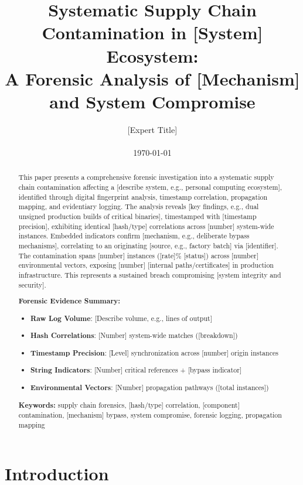 \documentclass[12pt,a4paper]{article}
\title{\Huge Systematic Supply Chain Contamination in [System] Ecosystem: \\
\Large A Forensic Analysis of [Mechanism] and System Compromise}
\author{[Expert Title] \\ 
[Location] \\
\today}
\date{}
\begin{document}
\maketitle

\begin{abstract}
This paper presents a comprehensive forensic investigation into a systematic supply chain contamination affecting a [describe system, e.g., personal computing ecosystem], identified through digital fingerprint analysis, timestamp correlation, propagation mapping, and evidentiary logging. The analysis reveals [key findings, e.g., dual unsigned production builds of critical binaries], timestamped with [timestamp precision], exhibiting identical [hash/type] correlations across [number] system-wide instances. Embedded indicators confirm [mechanism, e.g., deliberate bypass mechanisms], correlating to an originating [source, e.g., factory batch] via [identifier]. The contamination spans [number] instances ([rate]\% [status]) across [number] environmental vectors, exposing [number] [internal paths/certificates] in production infrastructure. This represents a sustained breach compromising [system integrity and security].

\textbf{Forensic Evidence Summary:}
\begin{itemize}
    \item \textbf{Raw Log Volume}: [Describe volume, e.g., lines of output]
    \item \textbf{Hash Correlations}: [Number] system-wide matches ([breakdown])
    \item \textbf{Timestamp Precision}: [Level] synchronization across [number] origin instances
    \item \textbf{String Indicators}: [Number] critical references + [bypass indicator]
    \item \textbf{Environmental Vectors}: [Number] propagation pathways ([total instances])
\end{itemize}

\textbf{Keywords:} supply chain forensics, [hash/type] correlation, [component] contamination, [mechanism] bypass, system compromise, forensic logging, propagation mapping
\end{abstract}

\newpage

\section{Introduction}
\end{document}
